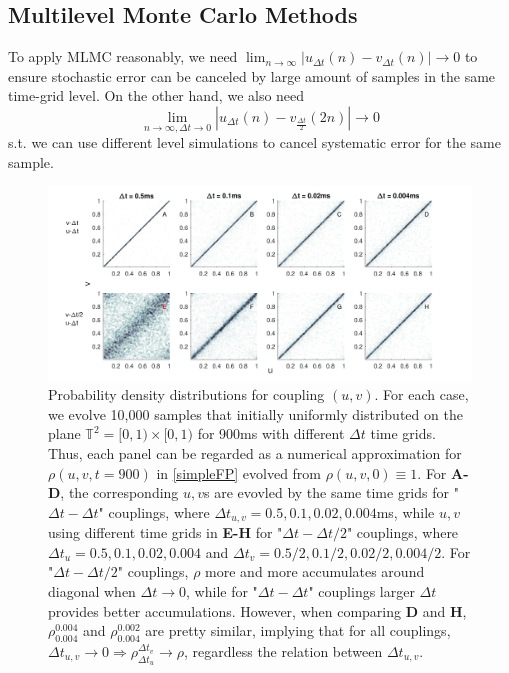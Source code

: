 \documentclass[10pt]{article}
\begin{document}
\begin{multicols}{2}
\subsection{Multilevel Monte Carlo Methods}
\indent To apply MLMC reasonably, we need $\lim_{n\to \infty}|u_{\Delta t}(n)-v_{\Delta t}(n)|\to 0$ to ensure stochastic error can be canceled by large amount of samples in the same time-grid level. On the other hand, we also need $$\lim_{n\to \infty, \Delta t\to 0}|u_{\Delta t}(n)-v_{\frac{\Delta t}{2}}(2n)|\to 0$$ s.t. we can use different level simulations to cancel systematic error for the same sample.
\end{multicols}
\newpage

\begin{figure}%


\includegraphics[width=\textwidth]{u-v.pdf}
\caption{\color{Gray} Probability density distributions for coupling $(u,v)$. For each case, we evolve 10,000 samples that initially uniformly distributed on the plane $\mathbb{T}^2=[0,1)\times[0,1)$ for 900ms with different $\Delta t$ time grids. Thus, each panel can be regarded as a numerical approximation for $\rho(u,v,t=900)$ in \ref{simpleFP} evolved from $\rho(u,v,0)\equiv 1$. For {\bf A-D}, the corresponding $u,v$s are evovled by the same time grids for "$\Delta t-\Delta t$" couplings, where $\Delta t_{u,v} = 0.5,0.1,0.02,0.004$ms, while $u,v$ using different time grids in {\bf E-H} for "$\Delta t-\Delta t/2$" couplings, where $\Delta t_{u} = 0.5,0.1,0.02,0.004$ and $\Delta t_{v} = 0.5/2,0.1/2,0.02/2,0.004/2$. For "$\Delta t-\Delta t/2$" couplings, $\rho$ more and more accumulates around diagonal when $\Delta t\to0$, while for "$\Delta t-\Delta t$" couplings larger $\Delta t$ provides better accumulations. However, when comparing {\bf D} and {\bf H}, $\rho_{0.004}^{0.004}$ and $\rho_{0.004}^{0.002}$ are pretty similar, implying that for all couplings, $\Delta t_{u,v}\to 0\Rightarrow\rho_{\Delta t_u}^{\Delta t_v}\to\rho$, regardless the relation between $\Delta t_{u,v}$.}
\label{V0_V1} %
\end{figure}
\end{document}
